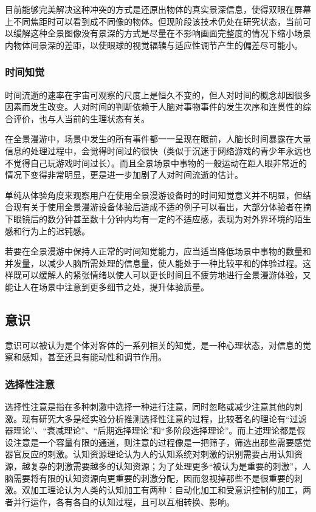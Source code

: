 目前能够完美解决这种冲突的方式是还原出物体的真实景深信息，使得双眼在屏幕上不同焦距时可以看到成不同像的物体。但现阶段该技术仍处在研究状态，当前可以缓解这种全景图像没有景深的方式是尽量在不影响画面完整度的情况下缩小场景内物体间景深的差距，以使眼球的视觉辐辏与适应性调节产生的偏差尽可能小。

\subsubsection{时间知觉}
时间流逝的速率在宇宙可观察的尺度上是恒久不变的，但人对时间的概念却因很多因素而发生改变。人对时间的判断依赖于人脑对事物事件的发生次序和连贯性的综合评价，也与人当前的生理状态有关。

在全景漫游中，场景中发生的所有事件都一一呈现在眼前，人脑长时间暴露在大量信息的处理过程中，会觉得时间过的很快（类似于沉迷于网络游戏的青少年永远也不觉得自己玩游戏时间过长）。而且全景场景中事物的一般运动在距人眼非常近的情况下变得非常明显，更是进一步加剧了人对时间流逝的估计。

单纯从体验角度来观察用户在使用全景漫游设备时的时间知觉意义并不明显，但结合现有关于使用全景漫游设备体验后造成不适的例子可以看出，大部分体验者在摘下眼镜后的数分钟甚至数十分钟内均有一定的不适应感，表现为对外界环境的陌生感和行为上的迟钝感。

若要在全景漫游中保持人正常的时间知觉能力，应当适当降低场景中事物的数量和并发量，以减少人脑所需处理的信息量，使人能处于一种比较平和的体验过程。这样既可以缓解人的紧张情绪以使人可以更长时间且不疲劳地进行全景漫游体验，又能让人在场景中注意到更多细节之处，提升体验质量。

\subsection{意识}
意识可以被认为是个体对客体的一系列相关的知觉，是一种心理状态，对信息的觉察和感知，甚至还具有能动性和调节作用。

\subsubsection{选择性注意}
选择性注意是指在多种刺激中选择一种进行注意，同时忽略或减少注意其他的刺激。现有研究大多是经实验分析推测选择性注意的过程，比较著名的理论有“过滤器理论”、“衰减理论”、“后期选择理论”和“多阶段选择理论”。而上述理论都是假设注意是一个容量有限的通道，则注意的过程像是一把筛子，筛选出那些需要感觉器官反应的刺激。认知资源理论认为人的认知系统对刺激的识别需要占用认知资源，越复杂的刺激需要越多的认知资源；为了处理更多“被认为是重要的刺激”，人脑需要将有限的认知资源向更重要的刺激分配，因而忽视掉那些不是很重要的刺激。双加工理论认为人类的认知加工有两种：自动化加工和受意识控制的加工，两者并行运作，各有各自的认知过程，且可以互相转换、影响。

